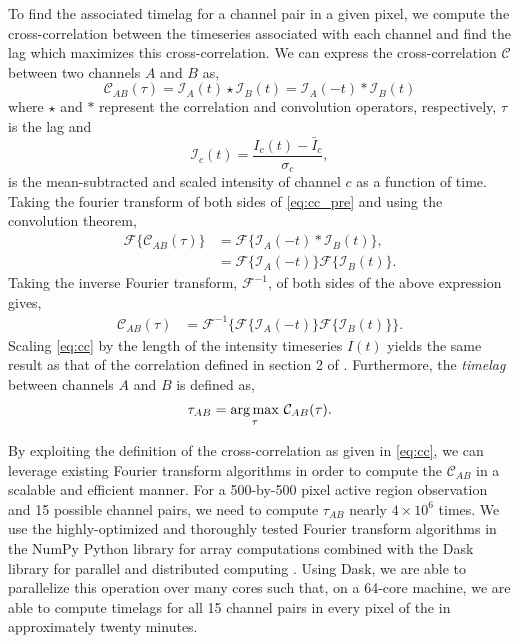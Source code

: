 To find the associated timelag for a channel pair in a given pixel, we compute the cross-correlation between the timeseries associated with each channel and find the lag which maximizes this cross-correlation. We can express the cross-correlation $\mathcal{C}$ between two channels $A$ and $B$ as,
\begin{equation}\label{eq:cc_pre}
    \mathcal{C}_{AB}(\tau) = \mathcal{I}_A(t)\star\mathcal{I}_B(t) = \mathcal{I}_A(-t)\ast\mathcal{I}_B(t)
\end{equation}
where $\star$ and $\ast$ represent the correlation and convolution operators, respectively, $\tau$ is the lag and
\begin{equation*}
    \mathcal{I}_c(t)=\frac{I_c(t)-\bar{I}_c}{\sigma_{c}},
\end{equation*}
is the mean-subtracted and scaled intensity of channel $c$ as a function of time. Taking the fourier transform of both sides of \autoref{eq:cc_pre} and using the convolution theorem,
\begin{align*}
    \mathcal{F}\{\mathcal{C}_{AB}(\tau)\} &= \mathcal{F}\{\mathcal{I}_A(-t)\ast\mathcal{I}_B(t)\},\\
    &= \mathcal{F}\{\mathcal{I}_A(-t)\}\mathcal{F}\{\mathcal{I}_B(t)\}.
\end{align*}
Taking the inverse Fourier transform, $\mathcal{F}^{-1}$, of both sides of the above expression gives,
\begin{align}\label{eq:cc}
    \mathcal{C}_{AB}(\tau) &= \mathcal{F}^{-1}\{\mathcal{F}\{\mathcal{I}_A(-t)\}\mathcal{F}\{\mathcal{I}_B(t)\}\}.
\end{align}
Scaling \autoref{eq:cc} by the length of the intensity timeseries $I(t)$ yields the same result as that of the correlation defined in section 2 of \citet{viall_evidence_2012}. Furthermore, the \textit{timelag} between channels $A$ and $B$ is defined as,
\begin{equation}\label{eq:timelag}
    \tau_{AB} = \argmax_{\tau}\,\mathcal{C}_{AB}(\tau).
\end{equation}

By exploiting the definition of the cross-correlation as given in \autoref{eq:cc}, we can leverage existing Fourier transform algorithms in order to compute the $\mathcal{C}_{AB}$ in a scalable and efficient manner. For a 500-by-500 pixel active region observation and 15 possible channel pairs, we need to compute $\tau_{AB}$ nearly $4\times10^6$ times. We use the highly-optimized and thoroughly tested Fourier transform algorithms in the NumPy Python library for array computations \citep{oliphant_guide_2006} combined with the Dask library for parallel and distributed computing \citep{dask_development_team_dask_2016}. Using Dask, we are able to parallelize this operation over many cores such that, on a 64-core machine, we are able to compute timelags for all 15 channel pairs in every pixel of the \AR{} in approximately twenty minutes.